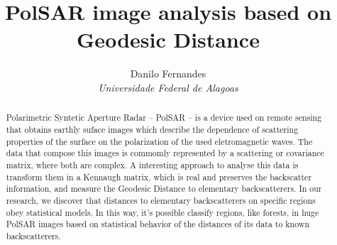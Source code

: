 \documentclass[12pt]{article}
\title{\textbf{\Large PolSAR image analysis based on Geodesic Distance}}
\author{\large
Danilo Fernandes \\ \textit{\large Universidade Federal de Alagoas}
}
\date{}
\begin{document}
\maketitle

\begin{abstract}

Polarimetric Syntetic Aperture Radar -- PolSAR -- is a device used on remote sensing that obtains earthly suface images which describe the dependence of scattering properties of the surface on the polarization of the used eletromagnetic waves. The data that compose this images is commomly represented by a scattering or covariance matrix, where both are complex. A interesting approach to analyse this data is transform them in a Kennaugh matrix, which is real and preserves the backscatter information, and measure the Geodesic Distance to elementary backscatterers. In our research, we discover that distances to elementary backscatterers on specific regions obey statistical models. In this way, it's possible classify regions, like forests, in huge PolSAR images based on statistical behavior of the distances of its data to known backscatterers.
\end{abstract}
\end{document}
